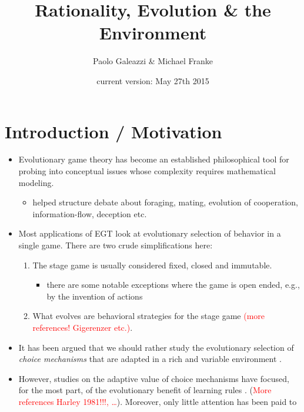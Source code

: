\documentclass[fleqn,reqno,11pt]{article}
\title{Rationality, Evolution \& the Environment}
\author{Paolo Galeazzi \& Michael Franke}
\date{current version: May 27th 2015}
\newcommand{\myalert}[1]{\textcolor{red}{#1}}
\begin{document}
\maketitle


\section{Introduction / Motivation}

\begin{itemize}
\item Evolutionary game theory has become an established philosophical tool for probing into
  conceptual issues whose complexity requires mathematical modeling.
  \begin{itemize}
  \item helped structure debate about foraging, mating, evolution of cooperation,
    information-flow, deception etc.
  \end{itemize}
\item Most applications of EGT look at evolutionary selection of behavior in a single
  game. There are two crude simplifications here:
  \begin{enumerate}
  \item The stage game is usually considered fixed, closed and immutable.
    \begin{itemize}
    \item there are some notable exceptions where the game is open ended, e.g., by the
      invention of actions \citep{WordenLevin2007:Evolutionary-es,
        McKenzie-AlexanderSkymrs2012:Inventing-New-S}
    \end{itemize}
  \item What evolves are behavioral strategies for the stage game \citep[what][call the
    ``behavioral gamit'']{FawcettHamblin2013:Exposing-the-be} \myalert{(more references!
      Gigerenzer etc.)}.
  \end{enumerate}
\item It has been argued that we should rather study the evolutionary selection of \emph{choice
    mechanisms} that are adapted in a rich and variable environment
  \citep[e.g.][]{FawcettHamblin2013:Exposing-the-be,McNamara2013:Towards-a-Riche}.
\item However, studies on the adaptive value of choice mechanisms have focused, for the most
  part, of the evolutionary benefit of learning rules
  \citep[e.g.][]{ZollmanSmead2010:Plasticity-and-,SmeadZollman2013:The-Stability-o}. (\myalert{More
    references Harley 1981!!!, \dots}). Moreover, only little attention has been paid to

\end{itemize}
\end{document}
